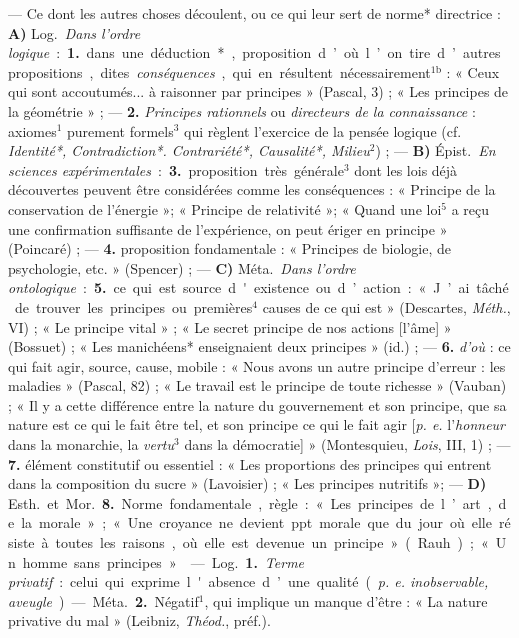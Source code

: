 \begin{itemize}[leftmargin=1cm, label=, itemsep=1pt]
 — Ce dont les autres choses découlent, ou ce qui leur sert de
norme* directrice : {\bf A)} \si{Log.} {\it Dans l'ordre logique} : {\bf 1.}
dans une déduction*, proposition d’où l’on tire d’autres propositions, dites
{\it conséquences}, qui en résultent nécessairement$^\text{1b}$ : « Ceux qui
sont accoutumés... à raisonner par principes » (Pascal, 3) ; « Les principes
de la géométrie » ; — {\bf 2.} {\it Principes rationnels} ou {\it directeurs
de la connaissance} : axiomes$^1$ purement formels$^3$ qui règlent
l'exercice de la pensée logique (cf. {\it Identité*, Contradiction*.
Contrariété*, Causalité*, Milieu$^2$}) ; — {\bf B)} \si{Épist.} {\it En
sciences expérimentales} : {\bf 3.} proposition très générale$^3$ dont les
lois déjà découvertes peuvent être considérées comme les conséquences : «
Principe de la conservation de l'énergie »; « Principe de relativité »; «
Quand une loi$^5$ a reçu une confirmation suffisante de l'expérience, on
peut ériger en principe » (Poincaré) ; — {\bf 4.} proposition fondamentale :
« Principes de biologie, de psychologie, etc. » (Spencer) ; — {\bf C)}
\si{Méta.} {\it Dans l’ordre ontologique} : {\bf 5.} ce qui est source
d'existence ou d’action : « J’ai tâché de trouver les principes ou
premières$^4$ causes de ce qui est » (Descartes, {\it Méth.}, VI) ; « Le
principe vital » ; « Le secret principe de nos actions [l'âme] » (Bossuet) ;
« Les manichéens* enseignaient deux principes » (id.) ; — {\bf 6.} {\it
d'où} : ce qui fait agir, source, cause, mobile : « Nous avons un autre
principe d'erreur : les maladies » (Pascal, 82) ; « Le travail est le
principe de toute richesse » (Vauban) ; « Il y a cette différence entre la
nature du gouvernement et son principe, que sa nature est ce qui le fait
être tel, et son principe ce qui le fait agir [{\it p. e.} l'{\it honneur}
dans la monarchie, la {\it vertu}$^3$ dans la démocratie] »
(Montesquieu, {\it Lois}, III, 1) ; — {\bf 7.} élément constitutif ou
essentiel : « Les proportions des principes qui entrent dans la composition
du sucre » (Lavoisier) ; « Les principes nutritifs »; — {\bf D)} \si{Esth.}
et \si{Mor.}  {\bf 8.} Norme fondamentale, règle : « Les principes de l’art,
de la morale »; « Une croyance ne devient ppt morale que du jour où elle
résiste à toutes les raisons, où elle est devenue un principe » (Rauh) ; «
Un homme sans principes ».

 — \si{Log.} {\bf 1.} {\it Terme privatif} : celui qui exprime
l'absence d’une qualité ({\it p. e. inobservable, aveugle}). — \si{Méta.}
{\bf 2.} Négatif$^1$, qui implique un manque d’être : « La nature privative
du mal » (Leibniz, {\it Théod.}, préf.).


\end{itemize}
